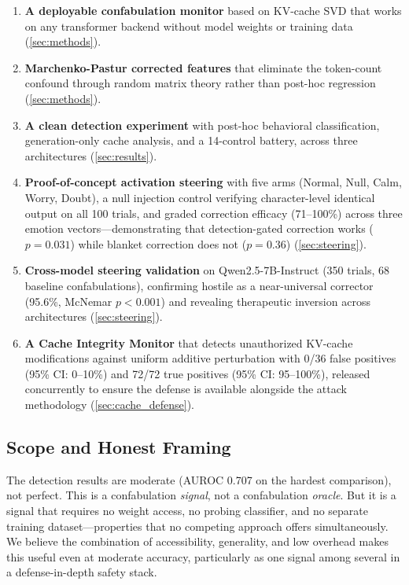 \begin{enumerate}[nosep]
  \item \textbf{A deployable confabulation monitor} based on KV-cache SVD
    that works on any transformer backend without model weights or
    training data (\cref{sec:methods}).
  \item \textbf{Marchenko-Pastur corrected features} that eliminate
    the token-count confound through random matrix theory rather than
    post-hoc regression (\cref{sec:methods}).
  \item \textbf{A clean detection experiment} with post-hoc behavioral
    classification, generation-only cache analysis, and a 14-control
    battery, across three architectures (\cref{sec:results}).
  \item \textbf{Proof-of-concept activation steering} with five arms
    (Normal, Null, Calm, Worry, Doubt), a null injection control
    verifying character-level identical output on all 100 trials, and
    graded correction efficacy (71--100\%) across three emotion
    vectors---demonstrating that detection-gated correction works
    ($p = 0.031$) while blanket correction does not ($p = 0.36$)
    (\cref{sec:steering}).
  \item \textbf{Cross-model steering validation} on Qwen2.5-7B-Instruct
    (350 trials, 68 baseline confabulations), confirming hostile as a
    near-universal corrector (95.6\%, McNemar $p < 0.001$) and revealing
    therapeutic inversion across architectures (\cref{sec:steering}).
  \item \textbf{A Cache Integrity Monitor} that detects unauthorized
    KV-cache modifications against uniform additive perturbation with
    0/36 false positives (95\% CI: 0--10\%) and 72/72 true positives
    (95\% CI: 95--100\%), released concurrently to ensure the defense
    is available alongside the attack methodology
    (\cref{sec:cache_defense}).
\end{enumerate}

\subsection{Scope and Honest Framing}

The detection results are moderate (AUROC 0.707 on the hardest
comparison), not perfect. This is a confabulation \emph{signal}, not a
confabulation \emph{oracle}. But it is a signal that requires no
weight access, no probing classifier, and no separate training
dataset---properties that no competing approach offers simultaneously. We believe the
combination of accessibility, generality, and low overhead makes this
useful even at moderate accuracy, particularly as one signal among several
in a defense-in-depth safety stack.
